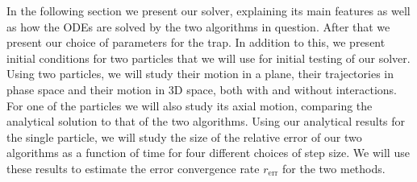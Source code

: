 In the following section we present our solver, explaining its main features as well as how the ODEs are solved by the two algorithms in question. After that we present our choice of parameters for the trap. In addition to this, we present initial conditions for two particles that we will use for initial testing of our solver. Using two particles, we will study their motion in a plane, their trajectories in phase space and their motion in 3D space, both with and without interactions. For one of the particles we will also study its axial motion, comparing the analytical solution to that of the two algorithms. Using our analytical results for the single particle, we will study the size of the relative error of our two algorithms as a function of time for four different choices of step size. We will use these results to estimate the error convergence rate $r_\mathrm{err}$ for the two methods. 



